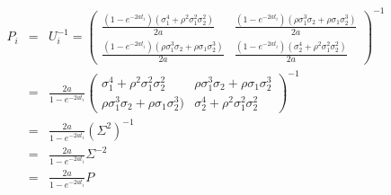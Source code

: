 \documentclass[12pt]{article}
\begin{document}
\begin{eqnarray*}
P_i & = &  U_i^{-1} =  \left( \begin{array}{cc}
\frac{(1- e^{-2a t_i}) (\sigma_1^4 + \rho^2 \sigma_1^2 \sigma_2^2 ) }{2 a} & \frac{(1 - e^{-2a t_i}) (\rho \sigma_1^3 \sigma_2 + \rho \sigma_1 \sigma_2^3) }{2a}  \\
\frac{(1 - e^{ -2a t_i}) (\rho \sigma_1^3 \sigma_2 + \rho \sigma_1 \sigma_2^3) }{2a} & \frac{ (1 - e^{-2 a t_i}) (\sigma_2^4 + \rho^2 \sigma_1^2 \sigma_2^2 ) }{2 a}  \end{array} \right) ^{-1} \\
& = & \frac{2a}{1-e^{-2at_i}}  \left( \begin{array}{cc}
\sigma_1^4 + \rho^2 \sigma_1^2 \sigma_2^2   & \rho \sigma_1^3 \sigma_2 + \rho \sigma_1 \sigma_2^3  \\
\rho \sigma_1^3 \sigma_2 + \rho \sigma_1 \sigma_2^3)  & \sigma_2^4 + \rho^2 \sigma_1^2 \sigma_2^2   \end{array} \right) ^{-1} \\
& = & \frac{2a}{1-e^{-2at_i}} \left( \Sigma^2 \right)^{-1} \\
& = & \frac{2a}{1-e^{-2at_i}} \Sigma^{-2} \\
& = & \frac{2a}{1-e^{-2at_i}} P
\end{eqnarray*}
\end{document}
